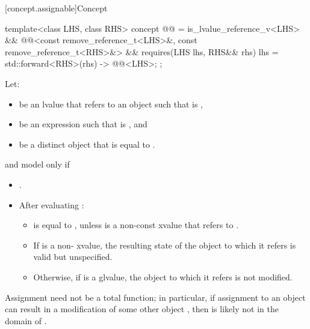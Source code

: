 [concept.assignable]{Concept }

\begin{itemdecl}
template<class LHS, class RHS>
  concept @@ =
    is_lvalue_reference_v<LHS> &&
    @@<const remove_reference_t<LHS>&, const remove_reference_t<RHS>&> &&
    requires(LHS lhs, RHS&& rhs) {
      { lhs = std::forward<RHS>(rhs) } -> @@<LHS>;
    };
\end{itemdecl}

\begin{itemdescr}
\pnum
Let:
\begin{itemize}
\item {} be an lvalue that refers to an object  such that
   is ,
\item {} be an expression such that  is
  , and
\item {} be a distinct object that is equal to .
\end{itemize}
 and  model
 only if

\begin{itemize}
\item {}.

\item After evaluating :

\begin{itemize}
\item {} is equal to , unless  is a non-const
xvalue that refers to .

\item If  is a non- xvalue, the resulting state of the
object to which it refers is valid but unspecified.

\item Otherwise, if  is a glvalue, the object to which it refers is
  not modified.
\end{itemize}
\end{itemize}

\pnum
\begin{note}
Assignment need not be a total function;
in particular, if assignment to an object  can result in a modification
of some other object , then  is likely not in the domain
of \tcode{=}.
\end{note}
\end{itemdescr}

